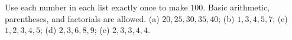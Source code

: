 Use each number in each list exactly once to make $100$. Basic arithmetic, parentheses, and factorials are allowed. (a) $20,25,30,35,40$; (b) $1,3,4,5,7$; (c) $1,2,3,4,5$; (d) $2,3,6,8,9$; (e) $2,3,3,4,4$.

